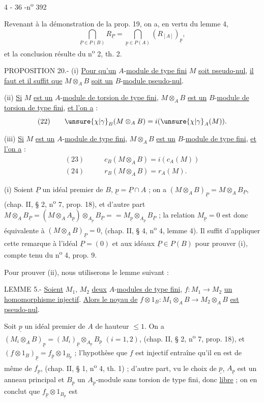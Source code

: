 \begin{center}4 - 36 -\hfill n\textsuperscript{o} 392\end{center}

Revenant à la démonstration de la prop. 19, on a, en vertu du lemme 4,
\[
\bigcap_{\underline{P}\in P(B)}R_{\underline{P}}=\bigcap_{\underline{p}\in P(A)}(R_{[A]})_{\underline{p}},
\]
et la conclusion résulte du n\textsuperscript{o} 2, th. 2.

PROPOSITION 20.- (i) \uline{Pour qu'un} $A$-\uline{module de type fini} $M$ \uline{soit pseudo-nul}, \uline{il faut et il suffit que} $M\otimes_A B$ \uline{soit un} $B$-\uline{module pseudo-nul}.

(ii) \uline{Si} $M$ \uline{est un} $A$-\uline{module de torsion de type fini}, $M\otimes_A B$ \uline{est un} $B$-\uline{module de torsion de type fini}, \uline{et l'on a} :
\[
(22)\qquad\unsure{\chi|\gamma}_B(M\otimes_A B)=i(\unsure{\chi|\gamma}_A(M)).
\]

(iii) \uline{Si} $M$ \uline{est un} $A$-\uline{module de type fini}, $M\otimes_A B$ \uline{est un} $B$-\uline{module de type fini}, \uline{et l'on a} :
\[
\begin{aligned}
(23)\qquad &c_B(M\otimes_A B)=i(c_A(M))\\
(24)\qquad &r_B(M\otimes_A B)=r_A(M).
\end{aligned}
\]

(i) Soient $\underline{P}$ un idéal premier de $B$, $\underline{p}=\underline{P}\cap A$ ; on a $(M\otimes_A B)_{\underline{P}}=M\otimes_A B_{\underline{P}}$, (chap. II, § 2, n\textsuperscript{o} 7, prop. 18), et d'autre part $M\otimes_A B_{\underline{P}}=(M\otimes_A A_{\underline{p}})\otimes_{A_{\underline{p}}}B_{\underline{P}}= {}=M_{\underline{p}}\otimes_{A_{\underline{p}}}B_{\underline{P}}$ ; la relation $M_{\underline{p}}=0$ est donc équivalente à $(M\otimes_A B)_{\underline{P}}=0$, (chap. II, § 4, n\textsuperscript{o} 4, lemme 4). Il suffit d'appliquer cette remarque à l'idéal $\underline{P}=(0)$ et aux idéaux $\underline{P}\in P(B)$ pour prouver (i), compte tenu du n\textsuperscript{o} 4, prop. 9.

Pour prouver (ii), nous utiliserons le lemme suivant :

LEMME 5.- \uline{Soient} $M_1$, $M_2$ \uline{deux} $A$-\uline{modules de type fini}, $f:M_1\longrightarrow M_2$ \uline{un homomorphisme injectif}. \uline{Alors le noyau de} $f\otimes1_B:M_1\otimes_A B\longrightarrow M_2\otimes_A B$ \uline{est pseudo-nul}.

Soit $\underline{p}$ un idéal premier de $A$ de hauteur $\le1$. On a $(M_i\otimes_A B)_{\underline{p}}=(M_i)_{\underline{p}}\otimes_{A_{\underline{p}}}B_{\underline{p}}$ $(i=1,2)$, (chap. II, § 2, n\textsuperscript{o} 7, prop. 18), et $(f\otimes1_B)_{\underline{p}}=f_{\underline{p}}\otimes1_{B_{\underline{p}}}$ ; l'hypothèse que $f$ est injectif entraîne qu'il en est de même de $f_{\underline{p}}$, (chap. II, § 1, n\textsuperscript{o} 4, th. 1) ; d'autre part, vu le choix de $\underline{p}$, $A_{\underline{p}}$ est un anneau principal et $B_{\underline{p}}$ un $A_{\underline{p}}$-module sans torsion de type fini, donc \uline{libre} ; on en conclut que $f_{\underline{p}}\otimes1_{B_{\underline{p}}}$ est

